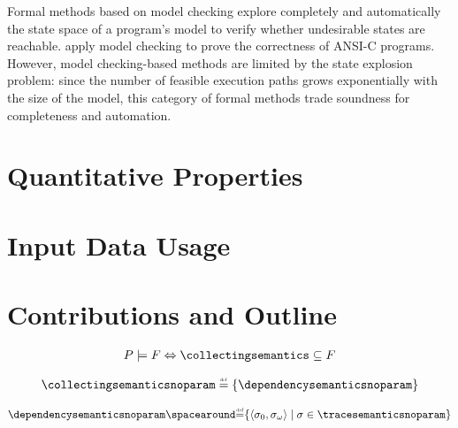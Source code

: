 Formal methods based on model checking explore completely and automatically the state space of a program's model to verify whether undesirable states are reachable.
 apply model checking to prove the correctness of ANSI-C programs.
However, model checking-based methods are limited by the state explosion problem: since the number of feasible execution paths grows exponentially with the size of the model, this category of formal methods trade soundness for completeness and automation.



\section{Quantitative Properties}

\section{Input Data Usage}

\section{Contributions and Outline}


\begin{definition}[Validation]
  \begin{align}
    \labeq{validation}
    \defprogram \satisfies \defproperty \iff \collectingsemantics \subseteq \defproperty
  \end{align}
\end{definition}

\begin{definition}
  \begin{align}
    \labeq{collecting-semantics}
    \collectingsemanticsnoparam \defeq \{ \dependencysemanticsnoparam \}
  \end{align}
\end{definition}

\begin{definition}
  \begin{align*}
    \dependencysemanticsnoparam \DefeQ \setdef{\inputoutputtuple{\defseq}}{\defseq\in\tracesemanticsnoparam}
  \end{align*}
\end{definition}
